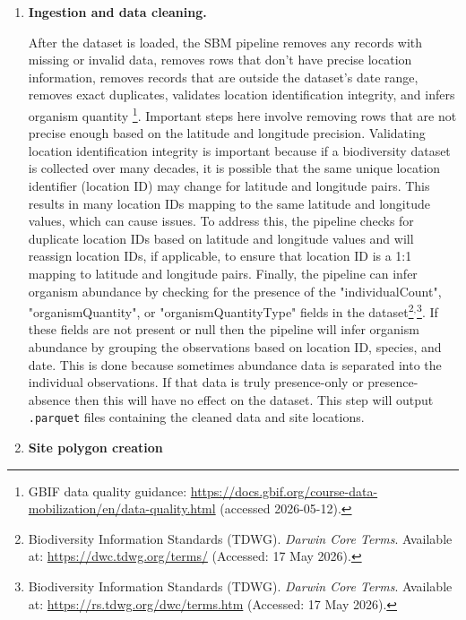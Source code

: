 \begin{enumerate}
\item \textbf{Ingestion and data cleaning.}

After the dataset is loaded, the SBM pipeline removes any records with missing or invalid data, removes rows that don't have precise location information, removes records that are outside the dataset's date range, removes exact duplicates, validates location identification integrity, and infers organism quantity \footnote{GBIF data quality guidance: \url{https://docs.gbif.org/course-data-mobilization/en/data-quality.html} (accessed 2026-05-12).}. Important steps here involve removing rows that are not precise enough based on the latitude and longitude precision. Validating location identification integrity is important because if a biodiversity dataset is collected over many decades, it is possible that the same unique location identifier (location ID) may change for latitude and longitude pairs. This results in many location IDs mapping to the same latitude and longitude values, which can cause issues. To address this, the pipeline checks for duplicate location IDs based on latitude and longitude values and will reassign location IDs, if applicable, to ensure that location ID is a 1:1 mapping to latitude and longitude pairs. Finally, the pipeline can infer organism abundance by checking for the presence of the "individualCount", "organismQuantity", or "organismQuantityType" fields in the dataset\footnote{Biodiversity Information Standards (TDWG). \textit{Darwin Core Terms}. Available at: \url{https://dwc.tdwg.org/terms/} (Accessed: 17 May 2026).}\(^,\)\footnote{Biodiversity Information Standards (TDWG). \textit{Darwin Core Terms}. Available at: \url{https://rs.tdwg.org/dwc/terms.htm} (Accessed: 17 May 2026).}. If these fields are not present or null then the pipeline will infer organism abundance by grouping the observations based on location ID, species, and date. This is done because sometimes abundance data is separated into the individual observations. If that data is truly presence-only or presence-absence then this will have no effect on the dataset. This step will output \texttt{.parquet} files containing the cleaned data and site locations.

\item \textbf{Site polygon creation}


\end{enumerate}
